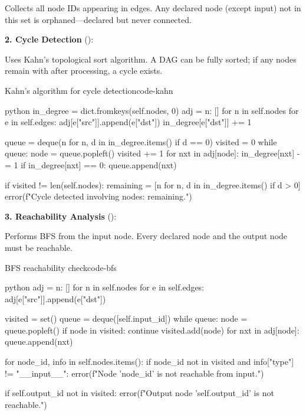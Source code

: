 \documentclass{nngraph-en}
\begin{document}
Collects all node IDs appearing in edges. Any declared node (except
input) not in this set is orphaned---declared but never connected.

\textbf{2. Cycle Detection} ():

Uses Kahn's topological sort algorithm. A DAG can be fully sorted;
if any nodes remain with  after processing,
a cycle exists.

\begin{codebox}{Kahn's algorithm for cycle detection}{code-kahn}
\begin{amzcode}{python}
in_degree = dict.fromkeys(self.nodes, 0)
adj       = {n: [] for n in self.nodes}
for e in self.edges:
    adj[e["src"]].append(e["dst"])
    in_degree[e["dst"]] += 1

queue   = deque(n for n, d in in_degree.items() if d == 0)
visited = 0
while queue:
    node = queue.popleft()
    visited += 1
    for nxt in adj[node]:
        in_degree[nxt] -= 1
        if in_degree[nxt] == 0:
            queue.append(nxt)

if visited != len(self.nodes):
    remaining = [n for n, d in in_degree.items() if d > 0]
    error(f"Cycle detected involving nodes: {remaining}.")
\end{amzcode}
\end{codebox}

\textbf{3. Reachability Analysis} ():

Performs BFS from the input node. Every declared node and the output
node must be reachable.

\begin{codebox}{BFS reachability check}{code-bfs}
\begin{amzcode}{python}
adj = {n: [] for n in self.nodes}
for e in self.edges:
    adj[e["src"]].append(e["dst"])

visited = set()
queue   = deque([self.input_id])
while queue:
    node = queue.popleft()
    if node in visited:
        continue
    visited.add(node)
    for nxt in adj[node]:
        queue.append(nxt)

for node_id, info in self.nodes.items():
    if node_id not in visited and info["type"] != "__input__":
        error(f"Node '{node_id}' is not reachable from input.")

if self.output_id not in visited:
    error(f"Output node '{self.output_id}' is not reachable.")
\end{amzcode}
\end{codebox}
\end{document}
